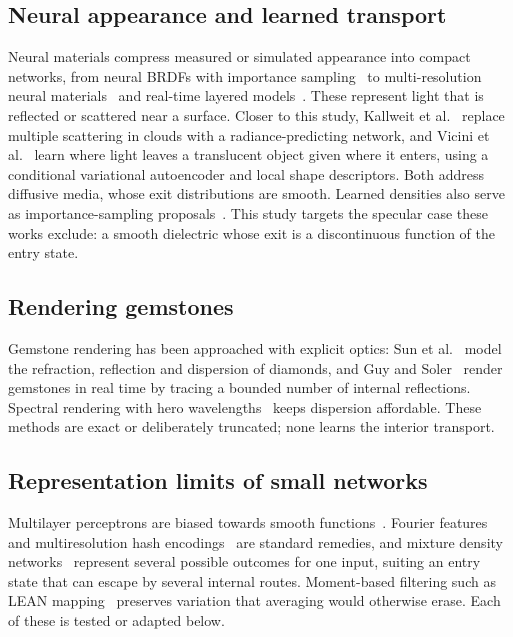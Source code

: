 \documentclass[conference]{IEEEtran}
\begin{document}
\subsection{Neural appearance and learned transport}
Neural materials compress measured or simulated appearance into compact
networks, from neural BRDFs with importance sampling~\cite{sztrajman2021} to
multi-resolution neural materials~\cite{kuznetsov2021} and real-time layered
models~\cite{zeltner2024}. These represent light that is reflected or scattered
near a surface. Closer to this study, Kallweit et al.~\cite{kallweit2017}
replace multiple scattering in clouds with a radiance-predicting network, and
Vicini et al.~\cite{vicini2019} learn where light leaves a translucent object
given where it enters, using a conditional variational autoencoder and local
shape descriptors. Both address diffusive media, whose exit distributions are
smooth. Learned densities also serve as importance-sampling
proposals~\cite{muller2019nis}. This study targets the specular case these
works exclude: a smooth dielectric whose exit is a discontinuous function of the
entry state.

\subsection{Rendering gemstones}
Gemstone rendering has been approached with explicit optics: Sun et
al.~\cite{sun2000} model the refraction, reflection and dispersion of diamonds,
and Guy and Soler~\cite{guy2004} render gemstones in real time by tracing a
bounded number of internal reflections. Spectral rendering with hero
wavelengths~\cite{wilkie2014} keeps dispersion affordable. These methods are
exact or deliberately truncated; none learns the interior transport.

\subsection{Representation limits of small networks}
Multilayer perceptrons are biased towards smooth functions~\cite{rahaman2019}.
Fourier features~\cite{tancik2020} and multiresolution hash
encodings~\cite{muller2022ngp} are standard remedies, and mixture density
networks~\cite{bishop1994} represent several possible outcomes for one input,
suiting an entry state that can escape by several internal routes. Moment-based
filtering such as LEAN mapping~\cite{olano2010} preserves variation that
averaging would otherwise erase. Each of these is tested or adapted below.
\end{document}
